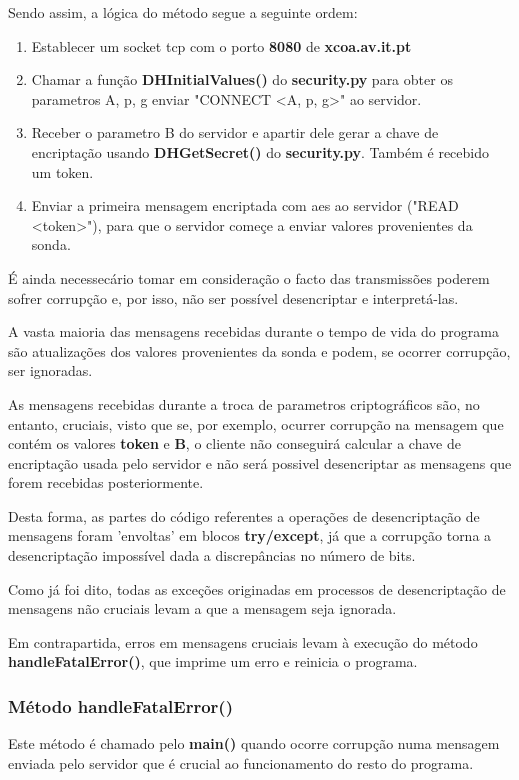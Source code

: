 \documentclass{report}
\begin{document}
Sendo assim, a lógica do método segue a seguinte ordem:
\begin{enumerate}
 \item Establecer um socket \ac{tcp} com o porto \textbf{8080} de \textbf{xcoa.av.it.pt}
  \item Chamar a função \textbf{DHInitialValues()} do \textbf{security.py} para obter os parametros A, p, g enviar "CONNECT <A, p, g>" ao servidor.
  \item Receber o parametro B do servidor e apartir dele gerar a chave de encriptação usando \textbf{DHGetSecret()} do \textbf{security.py}. Também é recebido um token.
  \item Enviar a primeira mensagem encriptada com \ac{aes} ao servidor ("READ <token>"), para que o servidor começe a enviar valores provenientes da sonda. 
\end{enumerate}

\hfill


É ainda necessecário tomar em consideração o facto das transmissões poderem sofrer corrupção e, por isso, não ser possível desencriptar e interpretá-las.

A vasta maioria das mensagens recebidas durante o tempo de vida do programa são atualizações dos valores provenientes da sonda e podem, se ocorrer corrupção, ser ignoradas.\newline

As mensagens recebidas durante a troca de parametros criptográficos são, no entanto, cruciais, visto que se, por exemplo, ocurrer corrupção na mensagem que contém os valores \textbf{token} e \textbf{B}, o cliente não conseguirá calcular a chave de encriptação usada pelo servidor e não será possivel desencriptar as mensagens que forem recebidas posteriormente. \newline

Desta forma, as partes do código referentes a operações de desencriptação de mensagens foram 'envoltas' em blocos \textbf{try/except}, já que a corrupção torna a desencriptação impossível dada a discrepâncias no número de bits.

Como já foi dito, todas as exceções originadas em processos de desencriptação de mensagens não cruciais levam a que a mensagem seja ignorada.

Em contrapartida, erros em mensagens cruciais levam à execução do método \textbf{handleFatalError()}, que imprime um erro e reinicia o programa.


\subsubsection{Método handleFatalError()}
Este método é chamado pelo \textbf{main()} quando ocorre corrupção numa mensagem enviada pelo servidor que é crucial ao funcionamento do resto do programa.
\end{document}
